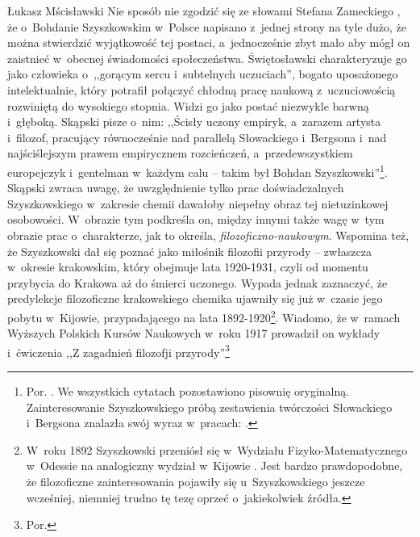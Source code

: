 \begin{artplenv}{Łukasz Mścisławski}
Nie sposób nie zgodzić się ze słowami Stefana Zameckiego
\parencite*[][s.~149]{zamecki_bohdan_1998}, %
 że o~Bohdanie Szyszkowskim w~Polsce napisano z~jednej strony na tyle dużo, że można stwierdzić wyjątkowość tej postaci, a~jednocześnie zbyt mało aby mógł on zaistnieć w~obecnej świadomości społeczeństwa. Świętosławski 
\parencite*[][]{swietoslawski_sp_1931} %
 charakteryzuje go jako człowieka o~,,gorącym sercu i~subtelnych uczuciach'', bogato uposażonego intelektualnie, który potrafił połączyć chłodną pracę naukową z~uczuciowością rozwiniętą do wysokiego stopnia. Widzi go jako postać niezwykle barwną i~głęboką. Skąpski pisze o~nim: ,,Ścisły uczony empiryk, a~zarazem artysta i~filozof, pracujący równocześnie nad parallelą Słowackiego i~Bergsona i~nad najściślejszym prawem empirycznem rozcieńczeń, a~przedewszystkiem europejczyk i~gentelman w~każdym calu -- takim był Bohdan Szyszkowski''\footnote{Por. 
\parencite[][]{skapski_charakterystyka_1931}. %
 We wszystkich cytatach pozostawiono pisownię oryginalną. Zainteresowanie Szyszkowskiego próbą zestawienia twórczości Słowackiego i~Bergsona znalazła swój wyraz w~pracach: 
\parencites[][]{szyszkowski_slowacki_1920-1}[][]{szyszkowski_slowacki_1920}[][]{szyszkowski_slowacki_1920-2}[][]{szyszkowski_slowacki_1921}.%
}. Skąpski zwraca uwagę, że uwzględnienie tylko prac doświadczalnych Szyszkowskiego w~zakresie chemii dawałoby niepełny obraz tej nietuzinkowej osobowości. W~obrazie tym podkreśla on, między innymi także wagę w~tym obrazie prac o~charakterze, jak to określa, \textit{filozoficzno-naukowym}. Wspomina też, że Szyszkowski dał się poznać jako miłośnik filozofii przyrody -- zwłaszcza w~okresie krakowskim, który obejmuje lata 1920-1931, czyli od momentu przybycia do Krakowa aż do śmierci uczonego. Wypada jednak zaznaczyć, że predylekcje filozoficzne krakowskiego chemika ujawniły się już w~czasie jego pobytu w~Kijowie, przypadającego na lata 1892-1920\footnote{W~roku 1892 Szyszkowski przeniósł się w~Wydziału Fizyko-Matematycznego w~Odessie na analogiczny wydział w~Kijowie 
\parencite[][]{sroka_szyszkowski_2002}. %
 Jest bardzo prawdopodobne, że filozoficzne zainteresowania pojawiły się u~Szyszkowskiego jeszcze wcześniej, niemniej trudno tę tezę oprzeć o~jakiekolwiek źródła.}. Wiadomo, że w~ramach Wyższych Polskich Kursów Naukowych w~roku 1917 prowadził on wykłady i~ćwiczenia ,,Z zagadnień filozofji przyrody''\footnote{Por. 
}
\end{artplenv}
